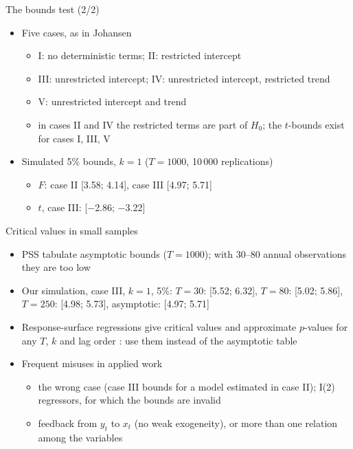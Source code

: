 \begin{frame}{The bounds test (2/2)}
\itemsize{\small}
\begin{itemize}
    \item Five cases, as in Johansen
    \begin{itemize}
        \item I: no deterministic terms; II: restricted intercept
        \item III: unrestricted intercept; IV: unrestricted intercept, restricted trend
        \item V: unrestricted intercept and trend
        \item in cases II and IV the restricted terms are part of $H_0$; the $t$-bounds exist for cases I, III, V
    \end{itemize}
    \item Simulated 5\% bounds, $k = 1$ ($T = 1000$, 10\,000 replications)
    \begin{itemize}
        \item $F$: case II [3.58; 4.14], case III [4.97; 5.71]
        \item $t$, case III: [\ensuremath{-}2.86; \ensuremath{-}3.22]
    \end{itemize}
\end{itemize}
\end{frame}

\begin{frame}{Critical values in small samples}
\itemsize{\small}
\begin{itemize}
    \item PSS tabulate asymptotic bounds ($T = 1000$); with 30--80 annual observations they are too low 
    \item Our simulation, case III, $k = 1$, 5\%: $T = 30$: [5.52; 6.32], $T = 80$: [5.02; 5.86], $T = 250$: [4.98; 5.73], asymptotic: [4.97; 5.71]
    \item Response-surface regressions give critical values and approximate $p$-values for any $T$, $k$ and lag order : use them instead of the asymptotic table
    \item Frequent misuses in applied work
    \begin{itemize}
        \item the wrong case (case III bounds for a model estimated in case II); I(2) regressors, for which the bounds are invalid
        \item feedback from $y_t$ to $x_t$ (no weak exogeneity), or more than one relation among the variables
    \end{itemize}
\end{itemize}
\end{frame}

